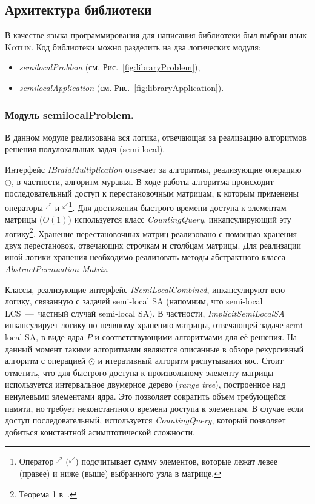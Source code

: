 
\subsection{Архитектура библиотеки}
В качестве языка программирования для написания библиотеки был выбран язык \textsc{Kotlin}.
Код библиотеки можно  разделить на два логических модуля:
\begin{itemize}
    \item \emph{semilocalProblem}  (см. Рис.~\ref{fig:libraryProblem}),
    \item \emph{semilocalApplication} (см. Рис.~\ref{fig:libraryApplication}).
\end{itemize}


\subsubsection{Модуль semilocalProblem.}
В данном модуле реализована вся логика, отвечающая за реализацию алгоритмов решения полулокальных задач ({semi-local}).

Интерфейс \emph{IBraidMultiplication} отвечает за алгоритмы, реализующие операцию $\odot$, в частности, алгоритм муравья.
В ходе работы алгоритма происходит последовательный доступ к перестановочным матрицам, к которым применены операторы $^{\nearrow}$ и $^{\swarrow}$\footnote{Оператор $^{\nearrow}$ ($^{\swarrow}$)  подсчитывает сумму элементов, которые лежат левее (правее) и ниже (выше) выбранного узла в матрице.}.
Для достижения быстрого времени доступа к элементам  матрицы ($O(1)$) используется
класс \emph{CountingQuery}, инкапсулирующий эту логику\footnote{Теорема 1 в~\cite{tiskin2015fast}.}.
% 
Хранение перестановочных матриц реализовано с помощью хранения двух перестановок, отвечающих строчкам и столбцам матрицы.
Для реализации иной логики хранения необходимо реализовать методы абстрактного класса \emph{AbstractPermuation-Matrix}.

Классы, реализующие интерфейс \emph{ISemiLocalCombined}, инкапсулируют всю логику, связанную с задачей {semi-local SA} (напомним, что {semi-local LCS}~---~частный случай {semi-local SA}).
В частности, \emph{ImplicitSemiLocalSA} инкапсулирует логику по неявному хранению матрицы, отвечающей задаче {semi-local SA}, в виде ядра $P$ и соответствующими алгоритмами для её решения.
На данный момент такими алгоритмами являются описанные в обзоре рекурсивный алгоритм с операцией $\odot$ и итеративный алгоритм распутывания кос.
Стоит отметить, что для быстрого доступа к произвольному элементу матрицы  используется интервальное двумерное дерево (\emph{range tree}), построенное над ненулевыми элементами ядра.
Это позволяет сократить объем требующейся памяти, но требует неконстантного времени доступа к элементам.
В случае если доступ последовательный, используется  \emph{CountingQuery}, который позволяет добиться константной асимптотической сложности.

